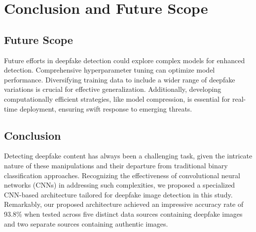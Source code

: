 \chapter{Conclusion and Future Scope}

\section{Future Scope}
Future efforts in deepfake detection could explore complex models for enhanced detection. Comprehensive hyperparameter tuning can optimize model performance. Diversifying training data to include a wider range of deepfake variations is crucial for effective generalization. Additionally, developing computationally efficient strategies, like model compression, is essential for real-time deployment, ensuring swift response to emerging threats.

\section{Conclusion}
Detecting deepfake content has always been a challenging task, given the intricate nature of these manipulations and their departure from traditional binary classification approaches. Recognizing the effectiveness of convolutional neural networks (CNNs) in addressing such complexities, we proposed a specialized CNN-based architecture tailored for deepfake image detection in this study. Remarkably, our proposed architecture achieved an impressive accuracy rate of 93.8\% when tested across five distinct data sources containing deepfake images and two separate sources containing authentic images. \\\\
